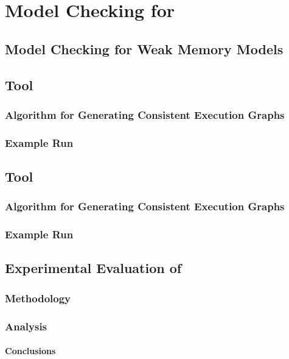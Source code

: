 \chapter{Model Checking for \WkmS}
\label{ch:mc-weakestmo2}

\section{Model Checking for Weak Memory Models}
\label{sec:mc-wmm}

\section{\genmc Tool}
\label{sec:genmc}

\subsection*{Algorithm for Generating \RCMM Consistent Execution Graphs}

\subsection*{Example Run}
\label{sec:genmc-ex}

\section{\wmc Tool}
\label{sec:wmc}

\subsection*{Algorithm for Generating \WkmS Consistent Execution Graphs}

\subsection*{Example Run}

\section{Experimental Evaluation of \wmc}
\label{sec:wmc-eval}

\newcommand{\RQ}[1]{\textbf{RQ{#1}.}}

\subsection*{Methodology}

\subsection*{Analysis}

\subsubsection*{Conclusions}


